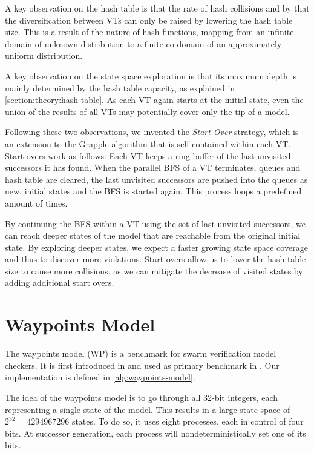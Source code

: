 \documentclass[
fancyheadings, %
%
%
]{stsreprt}
\begin{document}
A key observation on the hash table is that the rate of hash collisions and by that the diversification between VTs can only be raised by lowering the hash table size.
This is a result of the nature of hash functions, mapping from an infinite domain of unknown distribution to a finite co-domain of an approximately uniform distribution.

A key observation on the state space exploration is that its maximum depth is mainly determined by the hash table capacity, as explained in \cref{section:theory:hash-table}.
As each VT again starts at the initial state, even the union of the results of all VTs may potentially cover only the tip of a model.

Following these two observations, we invented the \emph{Start Over} strategy, which is an extension to the Grapple algorithm that is self-contained within each VT.
Start overs work as follows:
Each VT keeps a ring buffer of the last unvisited successors it has found.
When the parallel BFS of a VT terminates, queues and hash table are cleared, the last unvisited successors are pushed into the queues as new, initial states and the BFS is started again.
This process loops a predefined amount of times.

By continuing the BFS within a VT using the set of last unvisited successors, we can reach deeper states of the model that are reachable from the original initial state.
By exploring deeper states, we expect a faster growing state space coverage and thus to discover more violations.
Start overs allow us to lower the hash table size to cause more collisions, as we can mitigate the decrease of visited states by adding additional start overs.

\section{Waypoints Model}
\label{section:theory:waypoints-model}

The waypoints model (WP) is a benchmark for swarm verification model checkers.
It is first introduced in \cite{Holzmann2011.Swarm-Verification-Techniques} and used as primary benchmark in \cite{DeFrancisco2020.Grapple}.
Our implementation is defined in \cref{alg:waypoints-model}.

The idea of the waypoints model is to go through all 32-bit integers, each representing a single state of the model.
This results in a large state space of $2^{32}=\num{4294967296}$ states.
To do so, it uses eight processes, each in control of four bits.
At successor generation, each process will nondeterministically set one of its bits.
\end{document}
